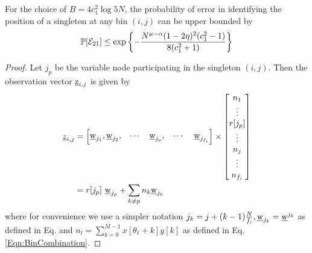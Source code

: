 \begin{lemma}
For the choice of $B=4c_1^2\log 5N$, the probability of error in identifying the position of a singleton at any bin $(i,j)$ can be upper bounded by
\begin{align*}
\mathbb{P}[\mathcal{E}_{21}]\leq \exp\left\lbrace-\frac{N^{\mu-\alpha}(1-2\eta)^2(c_1^2-1)}{8(c_1^2+1)}\right\rbrace
\end{align*}
\end{lemma}
\begin{proof}
	
	Let $j_p$ be the variable node participating in the singleton $(i,j)$. Then the observation vector $\underline{\mathrm{z}}_{i,j}$ is given by
	\begin{align*}
	\underline{z}_{i,j} &= \begin{bmatrix}
	\wv_{j_{1}},\wv_{j_2}, & \cdots   & \wv_{j_p}, &\cdots \ &\wv_{j_{f_i}}
	\end{bmatrix} \times
	\begin{bmatrix}
	n_{1} \\
	\vdots \\
	r[j_p]\\
	\vdots\\
	n_{j} \\
	\vdots\\
	n_{f_i}\\
	\end{bmatrix}\\
	&= r[j_p] ~ \wv_{j_p}+ \sum_{k \neq p}n_k \wv_{j_k} \\
	\end{align*}
	where for convenience we use a simpler notation $j_k=j+(k-1)\frac{N}{f_i}, \underline{\mathrm{w}}_{j_k}=\underline{\mathrm{w}}^{j_k}$ as defined in Eq. and $n_{l}=\sum\limits_{k=0}^{M-1}x[\theta_{\ell}+k]y[k]$ as defined in Eq. \eqref{Eqn:BinCombination}.
	

\end{proof}
